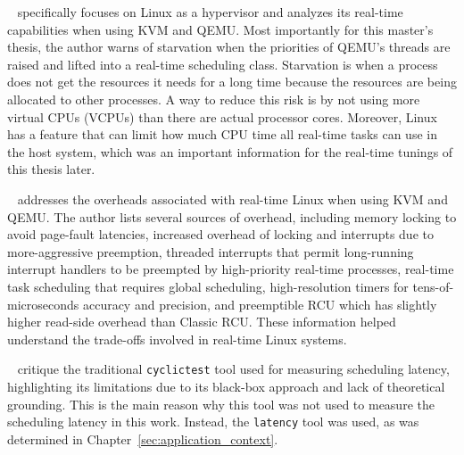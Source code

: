 \documentclass[MMR,Master,english]{twbook}
\begin{document}
\bigskip \noindent \citeauthor{kiszkaLinuxRealTimeHypervisor}~\cite{kiszkaLinuxRealTimeHypervisor} specifically focuses on Linux as a hypervisor and analyzes its real-time capabilities when using KVM and QEMU. Most importantly for this master's thesis, the author warns of starvation when the priorities of QEMU’s threads are raised and lifted into a real-time scheduling class. Starvation is when a process does not get the resources it needs for a long time because the resources are being allocated to other processes. A way to reduce this risk is by not using more virtual CPUs (VCPUs) than there are actual processor cores. Moreover, Linux has a feature that can limit how much CPU time all real-time tasks can use in the host system, which was an important information for the real-time tunings of this thesis later.

\clearpage

\bigskip \noindent \citeauthor{mckenneyRealTimeVs}~\cite{mckenneyRealTimeVs} addresses the overheads associated with real-time Linux when using KVM and QEMU. The author lists several sources of overhead, including memory locking to avoid page-fault latencies, increased overhead of locking and interrupts due to more-aggressive preemption, threaded interrupts that permit long-running interrupt handlers to be preempted by high-priority real-time processes, real-time task scheduling that requires global scheduling, high-resolution timers for tens-of-microseconds accuracy and precision, and preemptible RCU which has slightly higher read-side overhead than Classic RCU. These information helped understand the trade-offs involved in real-time Linux systems.

\bigskip \noindent \citeauthor{deoliveiraDemystifyingRealTimeLinux}~\cite{deoliveiraDemystifyingRealTimeLinux} critique the traditional \texttt{cyclictest} tool used for measuring scheduling latency, highlighting its limitations due to its black-box approach and lack of theoretical grounding. This is the main reason why this tool was not used to measure the scheduling latency in this work. Instead, the \texttt{latency} tool was used, as was determined in Chapter~\ref{sec:application_context}.
\end{document}
